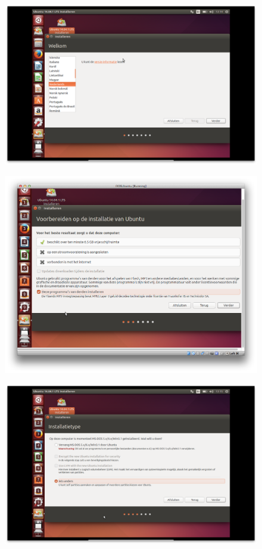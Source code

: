 \documentclass[11pt, a4paper]{article}
\begin{document}
\begin{figure}[H]
	\centering
	\includegraphics[width=\textwidth]{./IMG/K}
\end{figure}

\begin{figure}[H]
	\centering
	\includegraphics[width=\textwidth]{./IMG/L}
\end{figure}

\begin{figure}[H]
	\centering
	\includegraphics[width=\textwidth]{./IMG/M}
\end{figure}
\end{document}
